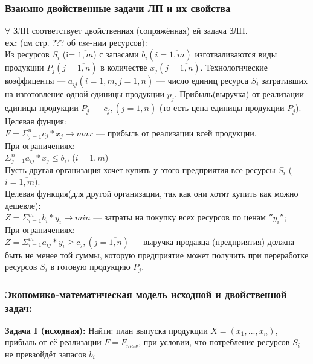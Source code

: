 \subsubsection{Взаимно двойственные задачи ЛП и их свойства}
$\forall$ ЗЛП соответствует двойственная (сопряжённая) ей задача ЗЛП.\\
\textbf{ex:} (см стр. ??? об use-нии ресурсов):\\
Из ресурсов $S_i$ (i= $\overline{1,m}$) с запасами $b_i (i= \overline{1,m})$ изготваливаются виды продукции $P_j (j= \overline{1,n})$ в количестве $x_j (j= \overline{1,n})$. Технологические коэффиценты --- $a_{ij} (i= \overline{1,m}, j= \overline{1,n})$ ---
число единиц ресурса $S_i$ затративших на изготовление одной единицы продукции $p_j$. Прибыль(выручка) от реализации единицы продукции $P_j$ --- $c_j, (j= \overline{1,n})$ (то есть цена единицы продукции $P_j$).\\
Целевая фунция:\\ $F = \Sigma_{j=1}^n c_j*x_j \rightarrow max $ --- прибыль от реализации всей продукции. \\
При ограничениях:\\ $\Sigma_{j=1}^n a_{ij}*x_j \leq b_i$, ($i=\overline{1,m}$)\\

Пусть другая организация хочет купить у этого предприятия все ресурсы $S_i$ ($i=\overline{1,m})$.\\
Целевая функция(для другой организации, так как они хотят купить как можно дешевле):\\ $Z = \Sigma_{i=1}^m b_i*y_i \rightarrow min$ --- затраты на покупку всех ресурсов по ценам $''y_i''$; \\
При ограничениях: \\ $Z = \Sigma_{i=1}^m a_{ij}*y_i \geq c_j, (j=\overline{1,n})$ --- выручка продавца (предприятия) должна быть не менее той суммы, которую предприятие может получить при переработке ресурсов $S_i$ в готовую продукцию $P_j$.\\
\newpage
\subsubsection{Экономико-математическая модель исходной и двойственной задач:}
\textbf{Задача I (исходная):}
Найти: план выпуска продукции $X=(x_1,...,x_n)$, прибыль от её реализации $F=F_{max}$, при условии, что потребление ресурсов $S_i$ не превзойдёт запасов $b_i$

